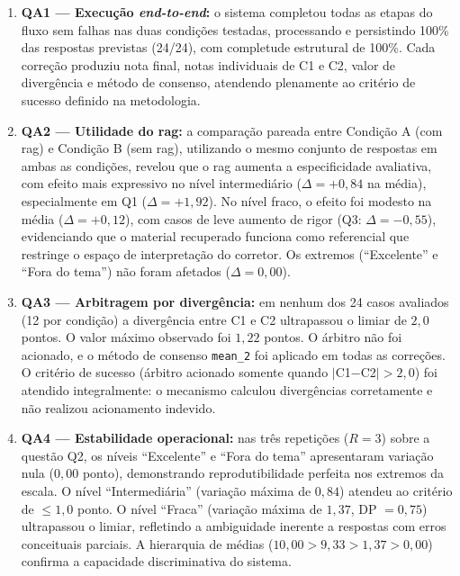 \begin{enumerate}
    \item \textbf{QA1 --- Execução \textit{end-to-end}:} o sistema completou todas as etapas do fluxo sem falhas nas duas condições testadas, processando e persistindo 100\% das respostas previstas (24/24), com completude estrutural de 100\%. Cada correção produziu nota final, notas individuais de C1 e C2, valor de divergência e método de consenso, atendendo plenamente ao critério de sucesso definido na metodologia.

    \item \textbf{QA2 --- Utilidade do \gls{rag}:} a comparação pareada entre Condição A (com \gls{rag}) e Condição B (sem \gls{rag}), utilizando o mesmo conjunto de respostas em ambas as condições, revelou que o \gls{rag} aumenta a especificidade avaliativa, com efeito mais expressivo no nível intermediário ($\Delta = +0{,}84$ na média), especialmente em Q1 ($\Delta = +1{,}92$). No nível fraco, o efeito foi modesto na média ($\Delta = +0{,}12$), com casos de leve aumento de rigor (Q3: $\Delta = -0{,}55$), evidenciando que o material recuperado funciona como referencial que restringe o espaço de interpretação do corretor. Os extremos (``Excelente'' e ``Fora do tema'') não foram afetados ($\Delta = 0{,}00$).

    \item \textbf{QA3 --- Arbitragem por divergência:} em nenhum dos 24 casos avaliados (12 por condição) a divergência entre C1 e C2 ultrapassou o limiar de $2{,}0$ pontos. O valor máximo observado foi $1{,}22$ pontos. O árbitro não foi acionado, e o método de consenso \texttt{mean\_2} foi aplicado em todas as correções. O critério de sucesso (árbitro acionado somente quando $|$C1$-$C2$| > 2{,}0$) foi atendido integralmente: o mecanismo calculou divergências corretamente e não realizou acionamento indevido.

    \item \textbf{QA4 --- Estabilidade operacional:} nas três repetições ($R=3$) sobre a questão Q2, os níveis ``Excelente'' e ``Fora do tema'' apresentaram variação nula ($0{,}00$ ponto), demonstrando reprodutibilidade perfeita nos extremos da escala. O nível ``Intermediária'' (variação máxima de $0{,}84$) atendeu ao critério de $\leq 1{,}0$ ponto. O nível ``Fraca'' (variação máxima de $1{,}37$, DP $= 0{,}75$) ultrapassou o limiar, refletindo a ambiguidade inerente a respostas com erros conceituais parciais. A hierarquia de médias ($10{,}00 > 9{,}33 > 1{,}37 > 0{,}00$) confirma a capacidade discriminativa do sistema.
\end{enumerate}

